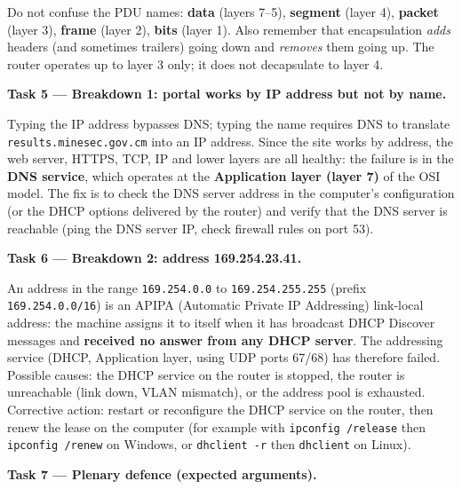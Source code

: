 \documentclass[11pt]{article}
\newcommand{\cle}[1]{{\popxbold\color{popdark}#1}}
\begin{document}
\begin{attention}
Do not confuse the PDU names: \textbf{data} (layers 7--5), \textbf{segment} (layer 4), \textbf{packet} (layer 3), \textbf{frame} (layer 2), \textbf{bits} (layer 1). Also remember that encapsulation \emph{adds} headers (and sometimes trailers) going down and \emph{removes} them going up. The router operates up to layer 3 only; it does not decapsulate to layer 4.
\end{attention}

\textbf{Task 5 — Breakdown 1: portal works by IP address but not by name.}

Typing the IP address bypasses \cle{DNS}; typing the name requires DNS to translate \texttt{results.minesec.gov.cm} into an IP address. Since the site works by address, the web server, HTTPS, TCP, IP and lower layers are all healthy: the failure is in the \textbf{DNS service}, which operates at the \textbf{Application layer (layer 7)} of the OSI model. The fix is to check the DNS server address in the computer's configuration (or the DHCP options delivered by the router) and verify that the DNS server is reachable (ping the DNS server IP, check firewall rules on port 53).

\textbf{Task 6 — Breakdown 2: address 169.254.23.41.}

An address in the range \texttt{169.254.0.0} to \texttt{169.254.255.255} (prefix \texttt{169.254.0.0/16}) is an \cle{APIPA} (Automatic Private IP Addressing) link-local address: the machine assigns it to itself when it has broadcast DHCP Discover messages and \textbf{received no answer from any DHCP server}. The addressing service (DHCP, Application layer, using UDP ports 67/68) has therefore failed. Possible causes: the DHCP service on the router is stopped, the router is unreachable (link down, VLAN mismatch), or the address pool is exhausted. Corrective action: restart or reconfigure the DHCP service on the router, then renew the lease on the computer (for example with \texttt{ipconfig /release} then \texttt{ipconfig /renew} on Windows, or \texttt{dhclient -r} then \texttt{dhclient} on Linux).

\textbf{Task 7 — Plenary defence (expected arguments).}
\end{document}
